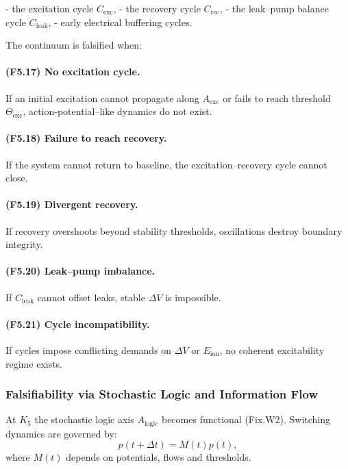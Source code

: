 - the excitation cycle $C_{\mathrm{exc}}$,
- the recovery cycle $C_{\mathrm{rec}}$,
- the leak–pump balance cycle $C_{\mathrm{leak}}$,
- early electrical buffering cycles.

The continuum is falsified when:

\paragraph{(F5.17) No excitation cycle.}
If an initial excitation cannot propagate along $A_{\mathrm{exc}}$
or fails to reach threshold $\Theta_{\mathrm{exc}}$,
action-potential–like dynamics do not exist.

\paragraph{(F5.18) Failure to reach recovery.}
If the system cannot return to baseline,
the excitation–recovery cycle cannot close.

\paragraph{(F5.19) Divergent recovery.}
If recovery overshoots beyond stability thresholds,
oscillations destroy boundary integrity.

\paragraph{(F5.20) Leak–pump imbalance.}
If $C_{\mathrm{leak}}$ cannot offset leaks,
stable $\Delta V$ is impossible.

\paragraph{(F5.21) Cycle incompatibility.}
If cycles impose conflicting demands on $\Delta V$ or $E_{\mathrm{ion}}$,
no coherent excitability regime exists.



\subsubsection{Falsifiability via Stochastic Logic and Information Flow}

At $K_5$ the stochastic logic axis $A_{\mathrm{logic}}$ becomes functional
(Fix.W2).
Switching dynamics are governed by:
\[
p(t+\Delta t) = M(t) p(t),
\]
where $M(t)$ depends on potentials, flows and thresholds.


